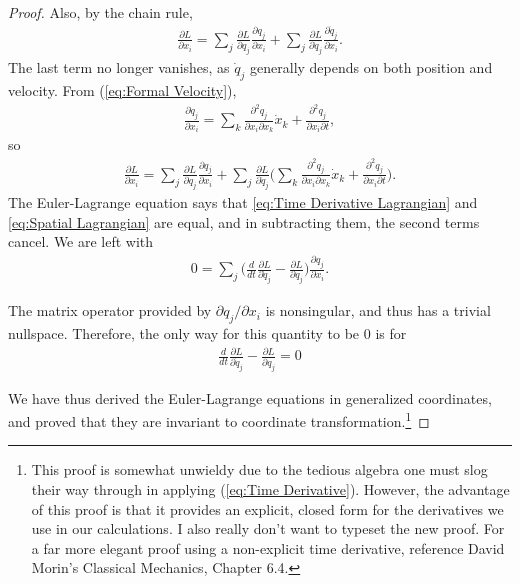 \documentclass[10pt, psamsfonts]{amsart}
\theoremstyle{definition}
\theoremstyle{remark}
\numberwithin{equation}{section}
\begin{document}
\begin{proof}
Also, by the chain rule, 
\begin{align*}
  \frac{\partial L}{\partial x_i}  = \sum_j \frac{\partial L}{\partial q_j} \frac{\partial q_j}{\partial x_i} + \sum_j \frac{\partial L}{\partial \dot{q}_j} \frac{\partial \dot{q}_j}{\partial x_i}.
\end{align*}
The last term no longer vanishes, as $\dot{q}_j$ generally depends on both position and velocity. From (\ref{eq:Formal Velocity}), 
\begin{gather*}
  \frac{\partial \dot{q}_j}{\partial x_i} = \sum_k \frac{\partial^2 q_j}{\partial x_i \partial x_k} \dot{x}_k + \frac{\partial^2 q_j}{\partial x_i \partial t},
\end{gather*}
so
\begin{gather}
\label{eq:Spatial Lagrangian}
  \frac{\partial L}{\partial x_i} = \sum_j \frac{\partial L}{\partial q_j} \frac{\partial q_j}{\partial x_i} + \sum_j \frac{\partial L}{\partial \dot{q}_j}\bigg(\sum_k \frac{\partial^2 q_j}{\partial x_i \partial x_k} \dot{x}_k + \frac{\partial^2 q_j}{\partial x_i \partial t}  \bigg).
\end{gather}
The Euler-Lagrange equation says that \ref{eq:Time Derivative Lagrangian} and \ref{eq:Spatial Lagrangian} are equal, and in subtracting them, the second terms cancel. We are left with
\begin{align*}
  0 = \sum_j \bigg(\frac{d}{dt} \frac{\partial L}{\partial \dot{q}_j} - \frac{\partial L}{\partial q_j} \bigg) \frac{\partial q_j}{\partial x_i} .
\end{align*}

The matrix operator provided by $\partial q_j/\partial x_i $ is nonsingular, and thus has a trivial nullspace. Therefore, the only way for this quantity to be 0 is for
\begin{align*}
  \frac{d}{dt} \frac{\partial L}{\partial \dot{q}_j} - \frac{\partial L}{\partial q_j} = 0
\end{align*}

We have thus derived the Euler-Lagrange equations in generalized coordinates, and proved that they are invariant to coordinate transformation.\footnote{This proof is somewhat unwieldy due to the tedious algebra one must slog their way through in applying (\ref{eq:Time Derivative}). However, the advantage of this proof is that it provides an explicit, closed form for the derivatives we use in our calculations.  I also really don't want to typeset the new proof. For a far more elegant proof using a non-explicit time derivative, reference David Morin's Classical Mechanics, Chapter 6.4.}
\end{proof}
\end{document}
